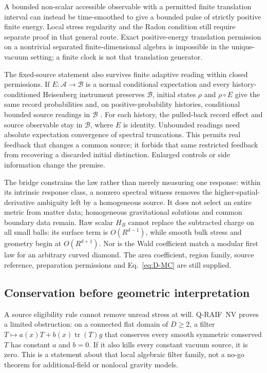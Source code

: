 A bounded non-scalar accessible observable with a permitted finite
translation interval can instead be time-smoothed to give a bounded
pulse of strictly positive finite energy. Local stress regularity and
the Radon condition still require separate proof in that general route.
Exact positive-energy translation permission on a nontrivial separated
finite-dimensional algebra is impossible in the unique-vacuum setting;
a finite clock is not that translation generator.

The fixed-source statement also survives finite adaptive reading
within closed permissions. If $E:\mathcal A\to\mathcal B$ is a normal
conditional expectation and every history-conditioned Heisenberg
instrument preserves $\mathcal B$, initial states $\rho$ and
$\rho\circ E$ give the same record probabilities and, on positive-probability
histories, conditional bounded source readings in $\mathcal B$ \cite{PaperCII}.
For each history, the pulled-back record effect and source observable
stay in $\mathcal B$, where $E$ is identity. Unbounded readings need
absolute expectation convergence of spectral truncations.
This permits real feedback that changes a common source; it forbids
that same restricted feedback from recovering a discarded initial
distinction. Enlarged controls or side information change the premise.

The bridge constrains the law rather than merely measuring one response:
within its intrinsic response class, a nonzero spectral witness removes
the higher-spatial-derivative ambiguity left by a homogeneous source.
It does not select an entire metric from matter data; homogeneous
gravitational solutions and common boundary data remain.
Raw scalar $H_B$ cannot replace the subtracted charge on all small
balls: its surface term is $O(R^{d-1})$, while smooth bulk stress and
geometry begin at $O(R^{d+1})$.
Nor is the Wald coefficient match a modular first law for an arbitrary
curved diamond. The area coefficient, region family, source reference,
preparation permissions and Eq.~\eqref{eq:D-MC} are still supplied.

\subsection{Conservation before geometric interpretation}
\label{sec:source-reaction}

A source eligibility rule cannot remove unread stress at will.
Q-RAIF~NV \cite[Section on physical selection and reaction]{QRNV}
proves a limited obstruction: on a connected flat domain of $D\ge2$,
a filter $T\mapsto a(x)T+b(x)\operatorname{tr}(T)g$ that conserves
every smooth symmetric conserved $T$ has constant $a$ and $b=0$.
If it also kills every constant vacuum source, it is zero.
This is a statement about that local algebraic filter family, not a
no-go theorem for additional-field or nonlocal gravity models.

